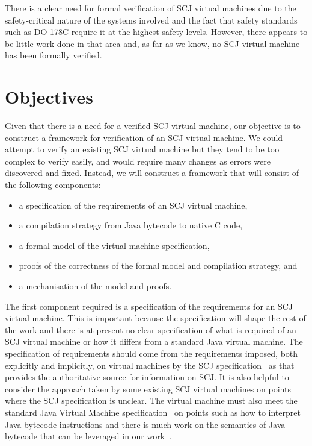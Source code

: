 \documentclass[a4paper,10pt]{report}
\begin{document}
There is a clear need for formal verification of SCJ virtual machines due to the
safety-critical nature of the systems involved and the fact that safety
standards such as DO-178C require it at the highest safety levels. However,
there appears to be little work done in that area and, as far as we know, no SCJ
virtual machine has been formally verified.


\section{Objectives}

Given that there is a need for a verified SCJ virtual machine, our objective is
to construct a framework for verification of an SCJ virtual machine.  We could
attempt to verify an existing SCJ virtual machine but they tend to be too
complex to verify easily, and would require many changes as errors were
discovered and fixed.  Instead, we will construct a framework that will consist
of the following components:
\begin{itemize}
\item a specification of the requirements of an SCJ virtual machine,
\item a compilation strategy from Java bytecode to native C code,
\item a formal model of the virtual machine specification,
\item proofs of the correctness of the formal model and compilation strategy,
  and
\item a mechanisation of the model and proofs.
\end{itemize}

The first component required is a specification of the requirements for an SCJ
virtual machine. This is important because the specification will shape the rest
of the work and there is at present no clear specification of what is required
of an SCJ virtual machine or how it differs from a standard Java virtual
machine.  The specification of requirements should come from the requirements
imposed, both explicitly and implicitly, on virtual machines by the SCJ
specification~\cite{locke2013} as that provides the authoritative source for
information on SCJ.  It is also helpful to consider the approach taken by some
existing SCJ virtual machines on points where the SCJ specification is unclear.
The virtual machine must also meet the standard Java Virtual Machine
specification~\cite{lindholm2014} on points such as how to interpret Java
bytecode instructions and there is much work on the semantics of Java bytecode
that can be leveraged in our work~\cite{bertelsen2000, jones1998, stark2001}.
\end{document}
